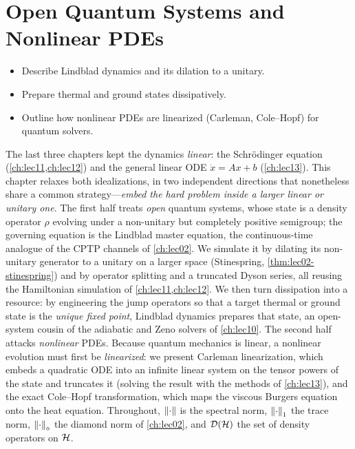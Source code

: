 \chapter{Open Quantum Systems and Nonlinear PDEs}
\label{ch:lec14}

\begin{objectives}
\begin{itemize}[leftmargin=1.4em,nosep]
  \item Describe Lindblad dynamics and its dilation to a unitary.
  \item Prepare thermal and ground states dissipatively.
  \item Outline how nonlinear PDEs are linearized (Carleman, Cole--Hopf) for quantum solvers.
\end{itemize}
\end{objectives}

The last three chapters kept the dynamics \emph{linear}: the Schr\"odinger equation
(\cref{ch:lec11,ch:lec12}) and the general linear ODE $\dot x=Ax+b$ (\cref{ch:lec13}). This
chapter relaxes both idealizations, in two independent directions that nonetheless share a common
strategy---\emph{embed the hard problem inside a larger linear or unitary one}. The first half
treats \emph{open} quantum systems, whose state is a density operator $\rho$ evolving under a
non-unitary but completely positive semigroup; the governing equation is the Lindblad master
equation, the continuous-time analogue of the CPTP channels of \cref{ch:lec02}. We simulate it
by dilating its non-unitary generator to a unitary on a larger space (Stinespring,
\cref{thm:lec02-stinespring}) and by operator splitting and a truncated Dyson series, all
reusing the Hamiltonian simulation of \cref{ch:lec11,ch:lec12}. We then turn dissipation into a
resource: by engineering the jump operators so that a target thermal or ground state is the
\emph{unique fixed point}, Lindblad dynamics prepares that state, an open-system cousin of the
adiabatic and Zeno solvers of \cref{ch:lec10}. The second half attacks \emph{nonlinear} PDEs.
Because quantum mechanics is linear, a nonlinear evolution must first be \emph{linearized}: we
present Carleman linearization, which embeds a quadratic ODE into an infinite linear system on
the tensor powers of the state and truncates it (solving the result with the methods of
\cref{ch:lec13}), and the exact Cole--Hopf transformation, which maps the viscous Burgers
equation onto the heat equation. Throughout, $\left\lVert \cdot \right\rVert$ is the spectral norm, $\left\lVert \cdot \right\rVert_1$
the trace norm, $\left\lVert \cdot \right\rVert_\diamond$ the diamond norm of \cref{ch:lec02}, and $\mathcal D(\mathcal{H})$
the set of density operators on $\mathcal{H}$.

